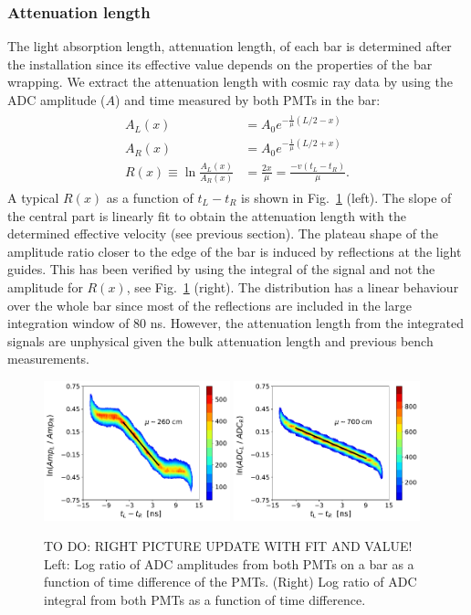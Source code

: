 \documentclass[3p,final,twocolumn]{elsarticle}
\begin{document}
\subsubsection{Attenuation length}
The light absorption length, attenuation length, of each bar is determined after the installation since its effective value depends on the properties of the bar wrapping.
We extract the attenuation length with cosmic ray data by using the 
ADC amplitude ($A$) and time measured by both PMTs in the bar:
\begin{eqnarray}
	\begin{split}
		A_L(x) &= A_0 e^{-\frac{1}{\mu}\left(L/2-x\right) }				\\
		A_R(x) &= A_0 e^{-\frac{1}{\mu}\left(L/2+x\right) }				\\
		R(x) \equiv \ln{\frac{A_L(x)}{A_R(x)}} &= \frac{2x}{\mu} = \frac{-v(t_{L}-t_{R})}{\mu}.			
		 \label{eqn:atten}
	\end{split}
\end{eqnarray}
A typical $R(x)$ as a function of $t_{L}-t_{R}$ is shown in Fig.~\ref{fig:atten} (left). 
The slope of the central part is linearly fit to obtain the attenuation length with the determined effective velocity (see previous section).
The plateau shape of the amplitude ratio closer to the edge of the bar is induced by reflections at the light guides. This has been verified by
using the integral of the signal and not the amplitude for $R(x)$, see Fig.~\ref{fig:atten} (right). The distribution has a linear behaviour over the whole bar since most of the reflections are included in the large integration window of 80 \si{\nano\s}. However, the attenuation length from the integrated signals are unphysical given the bulk attenuation length and previous bench measurements. 

\begin{figure}[tb]
	\centering
		\includegraphics[width=0.48\textwidth]{atten-amp.pdf}
		\includegraphics[width=0.48\textwidth]{atten-adc.pdf}
	\caption{TO DO: RIGHT PICTURE UPDATE WITH FIT AND VALUE! Left: Log ratio of ADC amplitudes from both PMTs on a bar as a function of time difference of the PMTs. (Right) Log ratio of ADC integral from both PMTs as a function of time difference.}
	\label{fig:atten}
\end{figure}
\end{document}
